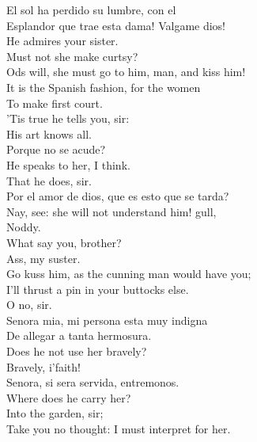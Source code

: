 \documentclass[a4paper,oneside,12pt]{memoir}
\begin{document}
\begin{drama*}
\surlyspeaks El sol ha perdido su lumbre, con el\\
Esplandor que trae esta dama! Valgame dios!\\
\facespeaks He admires your sister.\\
\kastrilspeaks {} Must not she make curtsy?\\
\subtlespeaks Ods will, she must go to him, man, and kiss him!\\
It is the Spanish fashion, for the women\\
To make first court.\\
\facespeaks {} 'Tis true he tells you, sir:\\
His art knows all.\\
\surlyspeaks {} Porque no se acude?\\
\kastrilspeaks He speaks to her, I think.\\
\facespeaks {} That he does, sir.\\
\surlyspeaks Por el amor de dios, que es esto que se tarda?\\
\kastrilspeaks Nay, see: she will not understand him! gull,\\
Noddy.\\
\pliantspeaks {} What say you, brother?\\
\kastrilspeaks {} Ass, my suster.\\
Go kuss him, as the cunning man would have you;\\
I'll thrust a pin in your buttocks else.\\
\facespeaks {} O no, sir.\\
\surlyspeaks Senora mia, mi persona esta muy indigna\\
De allegar a tanta hermosura.\\
\facespeaks Does he not use her bravely?\\
\kastrilspeaks {} Bravely, i'faith!\\
\surlyspeaks Senora, si sera servida, entremonos.\\
\kastrilspeaks Where does he carry her?\\
\facespeaks {} Into the garden, sir;\\
Take you no thought: I must interpret for her.\\

\end{drama*}
\end{document}
